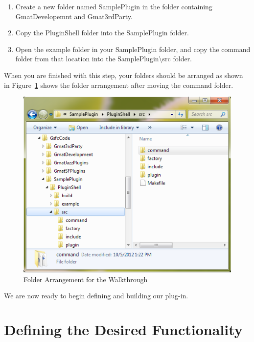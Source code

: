 \documentclass[10pt,letterpaper]{article}
\begin{document}
\begin{enumerate}
\item Create a new folder named SamplePlugin in the folder containing GmatDevelopemnt and Gmat3rdParty.
\item Copy the PluginShell folder into the SamplePlugin folder.
\item Open the example folder in your SamplePlugin folder, and copy the command folder from that location into the SamplePlugin{\textbackslash}src folder. 
\end{enumerate} 

\noindent When you are finished with this step, your folders should be arranged as shown in Figure~\ref{folderConfig} shows the folder arrangement after moving the command folder.

\begin{figure}[htb]
\begin{center}
\includegraphics[scale=.5]{images/FolderConfiguration.png}
\caption{\label{folderConfig}Folder Arrangement for the Walkthrough}
\end{center}
\end{figure}

\noindent We are now ready to begin defining and building our plug-in.

\section{Defining the Desired Functionality}
\end{document}
